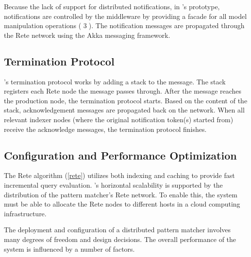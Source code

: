 Because the lack of support for distributed notifications, in \iqd{}'s prototype, notifications are controlled by the middleware by providing a facade for all model manipulation operations ( \textcircled{3}). The notification messages are propagated through the Rete network using the Akka messaging framework.

\subsection{Termination Protocol}

\iqd{}'s termination protocol works by adding a stack to the message. The stack registers each Rete node the message passes through. After the message reaches the production node, the termination protocol starts. Based on the content of the stack, acknowledgement messages are propagated back on the network. When all relevant indexer nodes (where the original notification token(s) started from) receive the acknowledge messages, the termination protocol finishes.


\subsection{Configuration and Performance Optimization}
 
The Rete algorithm (\autoref{rete}) utilizes both indexing and caching to provide fast incremental query evaluation. \iqd{}'s horizontal scalability is supported by the distribution of the pattern matcher's Rete network. To enable this, the system must be able to allocate the Rete nodes to different hosts in a cloud computing infrastructure. 

The deployment and configuration of a distributed pattern matcher involves many degrees of freedom and design decisions. The overall performance of the system is influenced by a number of factors.

